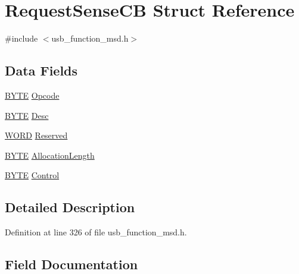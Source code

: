 \hypertarget{struct_request_sense_c_b}{}\section{Request\+Sense\+C\+B Struct Reference}
\label{struct_request_sense_c_b}


{\ttfamily \#include $<$usb\+\_\+function\+\_\+msd.\+h$>$}

\subsection*{Data Fields}
\begin{DoxyCompactItemize}
\item 
\hyperlink{_generic_type_defs_8h_a4ae1dab0fb4b072a66584546209e7d58}{B\+Y\+T\+E} \hyperlink{struct_request_sense_c_b_a3ac7536b907732d60214ae553910eed9}{Opcode}
\item 
\hyperlink{_generic_type_defs_8h_a4ae1dab0fb4b072a66584546209e7d58}{B\+Y\+T\+E} \hyperlink{struct_request_sense_c_b_ab53b187a02cb259546e71f45d3b3e196}{Desc}
\item 
\hyperlink{_generic_type_defs_8h_a2b0e863dadf920709ec53d9088ee7c91}{W\+O\+R\+D} \hyperlink{struct_request_sense_c_b_a3aef54172eb78efe737c8eb7b0093d3c}{Reserved}
\item 
\hyperlink{_generic_type_defs_8h_a4ae1dab0fb4b072a66584546209e7d58}{B\+Y\+T\+E} \hyperlink{struct_request_sense_c_b_a8c0a66f23ee960de672d690626364354}{Allocation\+Length}
\item 
\hyperlink{_generic_type_defs_8h_a4ae1dab0fb4b072a66584546209e7d58}{B\+Y\+T\+E} \hyperlink{struct_request_sense_c_b_a5dc24656c27deb12af74c98930f0bfc5}{Control}
\end{DoxyCompactItemize}


\subsection{Detailed Description}


Definition at line 326 of file usb\+\_\+function\+\_\+msd.\+h.



\subsection{Field Documentation}
\hypertarget{struct_request_sense_c_b_a8c0a66f23ee960de672d690626364354}{}
